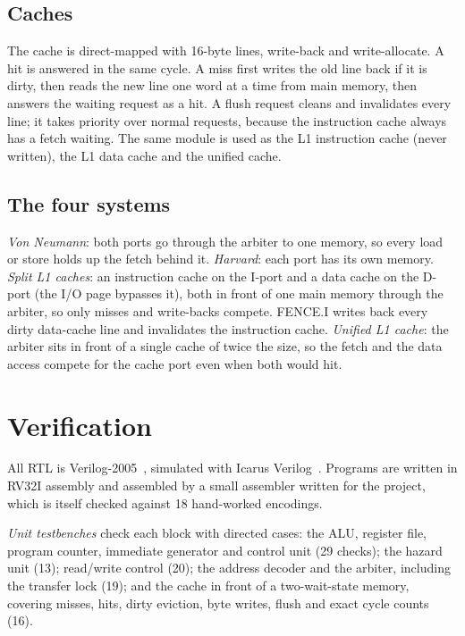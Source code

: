 \documentclass[conference]{IEEEtran}
\begin{document}
\subsection{Caches}
The cache is direct-mapped with 16-byte lines, write-back and write-allocate. A hit is answered in the same cycle. A miss first writes the old line back if it is dirty, then reads the new line one word at a time from main memory, then answers the waiting request as a hit. A flush request cleans and invalidates every line; it takes priority over normal requests, because the instruction cache always has a fetch waiting. The same module is used as the L1 instruction cache (never written), the L1 data cache and the unified cache.

\subsection{The four systems}
\emph{Von Neumann}: both ports go through the arbiter to one memory, so every load or store holds up the fetch behind it. \emph{Harvard}: each port has its own memory. \emph{Split L1 caches}: an instruction cache on the I-port and a data cache on the D-port (the I/O page bypasses it), both in front of one main memory through the arbiter, so only misses and write-backs compete. FENCE.I writes back every dirty data-cache line and invalidates the instruction cache. \emph{Unified L1 cache}: the arbiter sits in front of a single cache of twice the size, so the fetch and the data access compete for the cache port even when both would hit.

\section{Verification}
\label{sec:verification}

All RTL is Verilog-2005~\cite{verilog}, simulated with Icarus Verilog~\cite{iverilog}. Programs are written in RV32I assembly and assembled by a small assembler written for the project, which is itself checked against 18 hand-worked encodings.

\emph{Unit testbenches} check each block with directed cases: the ALU, register file, program counter, immediate generator and control unit (29 checks); the hazard unit (13); read/write control (20); the address decoder and the arbiter, including the transfer lock (19); and the cache in front of a two-wait-state memory, covering misses, hits, dirty eviction, byte writes, flush and exact cycle counts (16).
\end{document}
